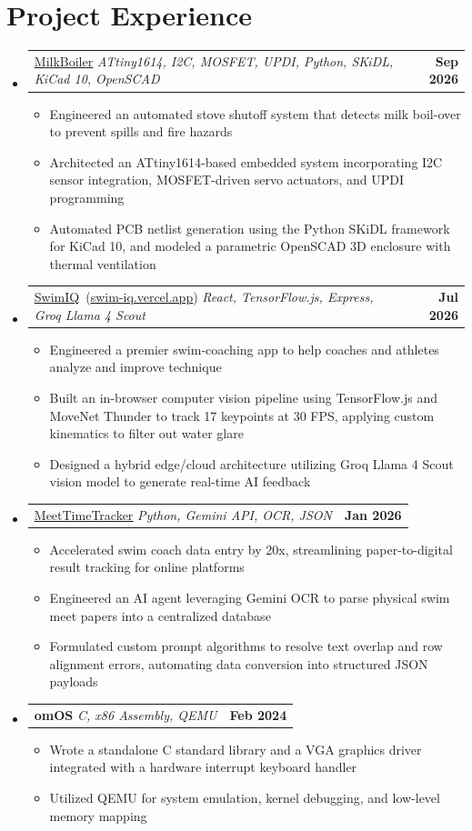 \documentclass[letterpaper,11pt]{article}
\makeatletter
\newcommand{\resumeItem}[1]{
  \item\small{
    {#1 \vspace{-3pt}}
  }
}
\newcommand{\resumeProjectHeading}[2]{
    \item
    \begin{tabular*}{1.001\textwidth}{l@{\extracolsep{\fill}}r}
      \small#1 & \textbf{\small #2}\\
    \end{tabular*}\vspace{-9pt}
}
\newcommand{\resumeSubHeadingListStart}{\begin{itemize}[leftmargin=0.0in, label={}]}
\newcommand{\resumeSubHeadingListEnd}{\end{itemize}}
\newcommand{\resumeItemListStart}{\begin{itemize}[leftmargin=0.15in, labelsep=0.05in]}
\newcommand{\resumeItemListEnd}{\end{itemize}\vspace{-7pt}}
\makeatother
\begin{document}
\section{Project Experience}
   \vspace{-5pt}
   \resumeSubHeadingListStart
     \resumeProjectHeading
         {\href{https://github.com/om-raheja/milkboiler}{\underline{MilkBoiler}} \textbar{} \emph{ATtiny1614, I2C, MOSFET, UPDI, Python, SKiDL, KiCad 10, OpenSCAD}}{Sep 2026}
         \resumeItemListStart
            \resumeItem{Engineered an automated stove shutoff system that detects milk boil-over to prevent spills and fire hazards}
            \resumeItem{Architected an ATtiny1614-based embedded system incorporating I2C sensor integration, MOSFET-driven servo actuators, and UPDI programming}
            \resumeItem{Automated PCB netlist generation using the Python SKiDL framework for KiCad 10, and modeled a parametric OpenSCAD 3D enclosure with thermal ventilation}
         \resumeItemListEnd
         \vspace{-16pt}
     \resumeProjectHeading
         {\href{https://github.com/acodes123/SwimIQ}{\underline{SwimIQ}} \,(\href{https://swim-iq.vercel.app/}{\underline{swim-iq.vercel.app}}) \textbar{} \emph{React, TensorFlow.js, Express, Groq Llama 4 Scout}}{Jul 2026}
         \resumeItemListStart

\resumeItem{Engineered a premier swim-coaching app to help coaches and athletes analyze and improve technique}

	 \resumeItem{Built an in-browser computer vision pipeline using TensorFlow.js and MoveNet Thunder to track 17 keypoints at 30 FPS, applying custom kinematics to filter out water glare}

\resumeItem{Designed a hybrid edge/cloud architecture utilizing Groq Llama 4 Scout vision model to generate real-time AI feedback}
         \resumeItemListEnd
         \vspace{-16pt}
     \resumeProjectHeading
         {\href{https://github.com/om-raheja/MeetTimeTracker}{\underline{MeetTimeTracker}} \textbar{} \emph{Python, Gemini API, OCR, JSON}}{Jan 2026}
         \resumeItemListStart
\resumeItem{Accelerated swim coach data entry by 20x, streamlining paper-to-digital result tracking for online platforms}
\resumeItem{Engineered an AI agent leveraging Gemini OCR to parse physical swim meet papers into a centralized database}
\resumeItem{Formulated custom prompt algorithms to resolve text overlap and row alignment errors, automating data conversion into structured JSON payloads}
         \resumeItemListEnd
         \vspace{-16pt}
     \resumeProjectHeading
         {\textbf{omOS} \textbar{} \emph{C, x86 Assembly, QEMU}}{Feb 2024}
         \resumeItemListStart
            \resumeItem{Wrote a standalone C standard library and a VGA graphics driver integrated with a hardware interrupt keyboard handler}
            \resumeItem{Utilized QEMU for system emulation, kernel debugging, and low-level memory mapping}
         \resumeItemListEnd
   \resumeSubHeadingListEnd
\vspace{-10pt}
\end{document}

